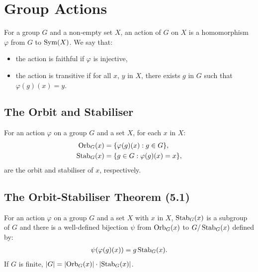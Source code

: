 \section{Group Actions}

For a group $G$ and a non-empty set $X$, an action of $G$ on $X$ is
a homomorphism $\varphi$ from $G$ to $\operatorname{Sym}(X)$. We say that: \begin{itemize}
    \item the action is faithful if $\varphi$ is injective,
    \item the action is transitive if for all $x$, $y$ in $X$,
        there exists $g$ in $G$ such that $\varphi(g)(x) = y$.
\end{itemize}

\subsection{The Orbit and Stabiliser}

For an action $\varphi$ on a group $G$ and a set $X$, for each $x$ in $X$: 
\begin{align*}
    \operatorname{Orb}_G(x)  &= \{\varphi(g)(x) : g \in G\}, \\
    \operatorname{Stab}_G(x) &= \{g \in G : \varphi(g)(x) = x\},
\end{align*} are the orbit and stabiliser of $x$, respectively.

\subsection{The Orbit-Stabiliser Theorem (5.1)} \label{5.1}

For an action $\varphi$ on a group $G$ and a set $X$ with $x$ in $X$, 
$\operatorname{Stab}_G(x)$ is a subgroup of $G$ and there is a
well-defined bijection $\psi$ from $\operatorname{Orb}_G(x)$ to $G / \operatorname{Stab}_G(x)$
defined by: \begin{align*}
    \psi(\varphi(g)(x)) = g\operatorname{Stab}_G(x).
\end{align*} If $G$ is finite, $|G| = |\!\operatorname{Orb}_G(x)| \cdot |\!\operatorname{Stab}_G(x)|$.


